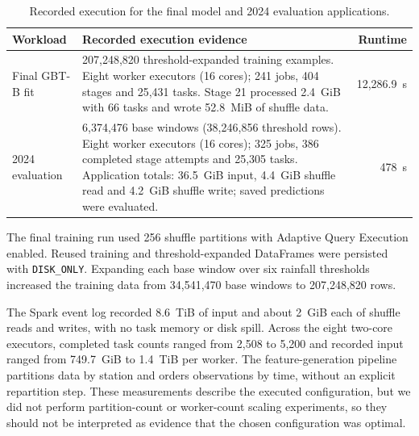 \documentclass[11pt,a4paper]{article}
\begin{document}
\begin{table}[htbp]
\centering\footnotesize
\caption{Recorded execution for the final model and 2024 evaluation applications.}
\label{tab:job-evidence}
\begin{tabularx}{\linewidth}{p{28mm} X r}
\toprule
Workload & Recorded execution evidence & Runtime \\
\midrule
Final GBT-B fit & 207,248,820 threshold-expanded training examples. Eight worker executors (16 cores); 241 jobs, 404 stages and 25,431 tasks. Stage 21 processed 2.4~GiB with 66 tasks and wrote 52.8~MiB of shuffle data. & 12,286.9~s \\
2024 evaluation & 6,374,476 base windows (38,246,856 threshold rows). Eight worker executors (16 cores); 325 jobs, 386 completed stage attempts and 25,305 tasks. Application totals: 36.5~GiB input, 4.4~GiB shuffle read and 4.2~GiB shuffle write; saved predictions were evaluated. & 478~s \\
\bottomrule
\end{tabularx}
\end{table}

\begin{samepage}
The final training run used 256 shuffle partitions with Adaptive Query
Execution enabled. Reused training and threshold-expanded DataFrames were
persisted with \texttt{DISK\_ONLY}. Expanding each base window over six rainfall
thresholds increased the training data from 34,541,470 base windows to
207,248,820 rows.

The Spark event log recorded 8.6~TiB of input and about 2~GiB each of shuffle
reads and writes, with no task memory or disk spill. Across the eight two-core
executors, completed task counts ranged from 2,508 to 5,200 and recorded input
ranged from 749.7~GiB to 1.4~TiB per worker. The feature-generation pipeline
partitions data by station and orders observations by time, without an explicit
repartition step. These measurements describe the executed configuration, but
we did not perform partition-count or worker-count scaling experiments, so they
should not be interpreted as evidence that the chosen configuration was
optimal.
\end{samepage}
\end{document}
